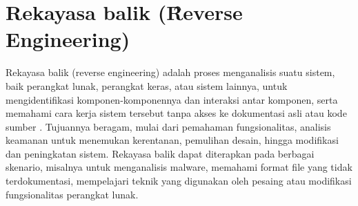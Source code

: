 \section{Rekayasa balik (\f{Reverse Engineering})}
Rekayasa balik (reverse engineering) adalah proses menganalisis suatu sistem, baik perangkat lunak, perangkat keras, atau sistem lainnya, untuk mengidentifikasi komponen-komponennya dan interaksi antar komponen, serta memahami cara kerja sistem tersebut tanpa akses ke dokumentasi asli atau kode sumber \cite{Has18}.  Tujuannya beragam, mulai dari pemahaman fungsionalitas, analisis keamanan untuk menemukan kerentanan, pemulihan desain, hingga modifikasi dan peningkatan sistem. Rekayasa balik dapat diterapkan pada berbagai skenario, misalnya untuk menganalisis malware, memahami format file yang tidak terdokumentasi, mempelajari teknik yang digunakan oleh pesaing atau modifikasi fungsionalitas perangkat lunak.

